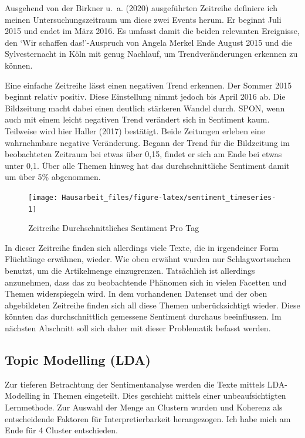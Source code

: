 \documentclass[
  11pt,
]{article}
\begin{document}
Ausgehend von der Birkner u.~a. (2020) ausgeführten Zeitreihe definiere
ich meinen Untersuchungszeitraum um diese zwei Events herum. Er beginnt
Juli 2015 und endet im März 2016. Es umfasst damit die beiden relevanten
Ereignisse, den `Wir schaffen das!'-Auspruch von Angela Merkel Ende
August 2015 und die Sylvesternacht in Köln mit genug Nachlauf, um
Trendveränderungen erkennen zu können.

Eine einfache Zeitreihe lässt einen negativen Trend erkennen. Der Sommer
2015 beginnt relativ positiv. Diese Einstellung nimmt jedoch bis April
2016 ab. Die Bildzeitung macht dabei einen deutlich stärkeren Wandel
durch. SPON, wenn auch mit einem leicht negativen Trend verändert sich
in Sentiment kaum. Teilweise wird hier Haller (2017) bestätigt. Beide
Zeitungen erleben eine wahrnehmbare negative Veränderung. Begann der
Trend für die Bildzeitung im beobachteten Zeitraum bei etwas über 0,15,
findet er sich am Ende bei etwas unter 0,1. Über alle Themen hinweg hat
das durchschnittliche Sentiment damit um über 5\% abgenommen.

\begin{figure}[H]
\texttt{[image: Hausarbeit\_files/figure-latex/sentiment\_timeseries-1]} \caption{Zeitreihe Durchschnittliches Sentiment Pro Tag}\label{fig:sentiment_timeseries}
\end{figure}

In dieser Zeitreihe finden sich allerdings viele Texte, die in
irgendeiner Form Flüchtlinge erwähnen, wieder. Wie oben erwähnt wurden
nur Schlagwortsuchen benutzt, um die Artikelmenge einzugrenzen.
Tatsächlich ist allerdings anzunehmen, dass das zu beobachtende Phänomen
sich in vielen Facetten und Themen widerspiegeln wird. In dem
vorhandenen Datenset und der oben abgebildeten Zeitreihe finden sich all
diese Themen unberücksichtigt wieder. Diese könnten das durchschnittlich
gemessene Sentiment durchaus beeinflussen. Im nächsten Abschnitt soll
sich daher mit dieser Problematik befasst werden.

\hypertarget{topic-modelling-lda}{%
\subsection{Topic Modelling (LDA)}\label{topic-modelling-lda}}

Zur tieferen Betrachtung der Sentimentanalyse werden die Texte mittels
LDA-Modelling in Themen eingeteilt. Dies geschieht mittels einer
unbeaufsichtigten Lernmethode. Zur Auswahl der Menge an Clustern wurden
und Koherenz als entscheidende Faktoren für Interpretierbarkeit
herangezogen. Ich habe mich am Ende für 4 Cluster entschieden.
\end{document}

